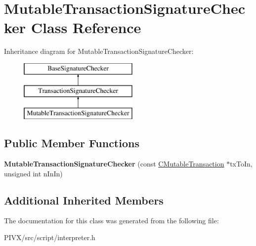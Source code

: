 \hypertarget{class_mutable_transaction_signature_checker}{}\section{Mutable\+Transaction\+Signature\+Checker Class Reference}
\label{class_mutable_transaction_signature_checker}
Inheritance diagram for Mutable\+Transaction\+Signature\+Checker\+:\begin{figure}[H]
\begin{center}
\leavevmode
\includegraphics[height=3.000000cm]{class_mutable_transaction_signature_checker}
\end{center}
\end{figure}
\subsection*{Public Member Functions}
\begin{DoxyCompactItemize}
\item 
\mbox{\label{class_mutable_transaction_signature_checker_ac46799549e6eeebaff38cb1c9f5e1663}} 
{\bfseries Mutable\+Transaction\+Signature\+Checker} (const \mbox{\hyperlink{struct_c_mutable_transaction}{C\+Mutable\+Transaction}} $\ast$tx\+To\+In, unsigned int n\+In\+In)
\end{DoxyCompactItemize}
\subsection*{Additional Inherited Members}


The documentation for this class was generated from the following file\+:\begin{DoxyCompactItemize}
\item 
P\+I\+V\+X/src/script/interpreter.\+h\end{DoxyCompactItemize}
